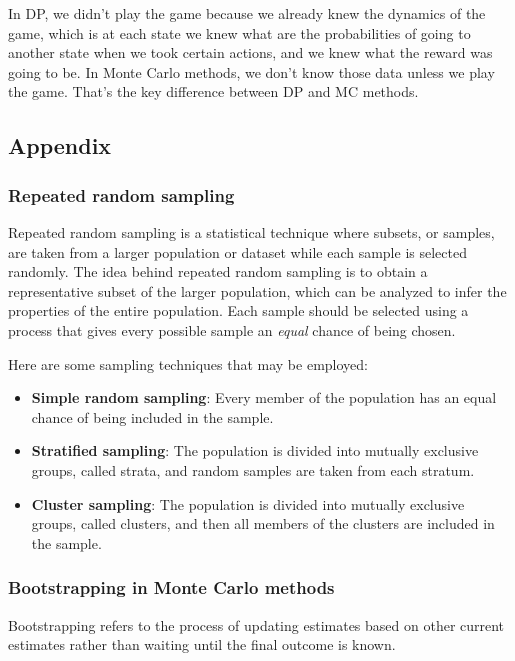 In DP, we didn't play the game because we already knew the dynamics of the game, which is at each state we knew what are the probabilities of going to another state when we took certain actions, and we knew what the reward was going to be. In Monte Carlo methods, we don't know those data unless we play the game. That's the key difference between DP and MC methods.

\subsection*{Appendix}

\subsubsection*{Repeated random sampling}\label{sec:repeated-random-sampling}

Repeated random sampling is a statistical technique where subsets, or samples, are taken from a larger population or dataset while each sample is selected randomly. The idea behind repeated random sampling is to obtain a representative subset of the larger population, which can be analyzed to infer the properties of the entire population. Each sample should be selected using a process that gives every possible sample an \emph{equal} chance of being chosen.

Here are some sampling techniques that may be employed:

\begin{itemize}
    \item \textbf{Simple random sampling}: Every member of the population has an equal chance of being included in the sample.
    \item \textbf{Stratified sampling}: The population is divided into mutually exclusive groups, called strata, and random samples are taken from each stratum.
    \item \textbf{Cluster sampling}: The population is divided into mutually exclusive groups, called clusters, and then all members of the clusters are included in the sample.
\end{itemize}

\subsubsection*{Bootstrapping in Monte Carlo methods}\label{sec:bootstrapping}

Bootstrapping refers to the process of updating estimates based on other current estimates rather than waiting until the final outcome is known.

